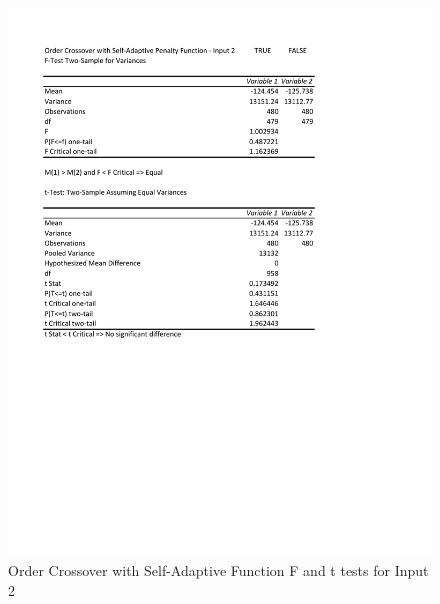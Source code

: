 \documentclass[times]{article}
\begin{document}
	\begin{figure}
		\caption{Order Crossover with Self-Adaptive Function F and t tests for Input 2}
		\label{fig:order_sa_penalty2}
		\includegraphics[width=\textwidth]{./t_test/order_crossover_sa_penalty2}
	\end{figure}
\end{document}
